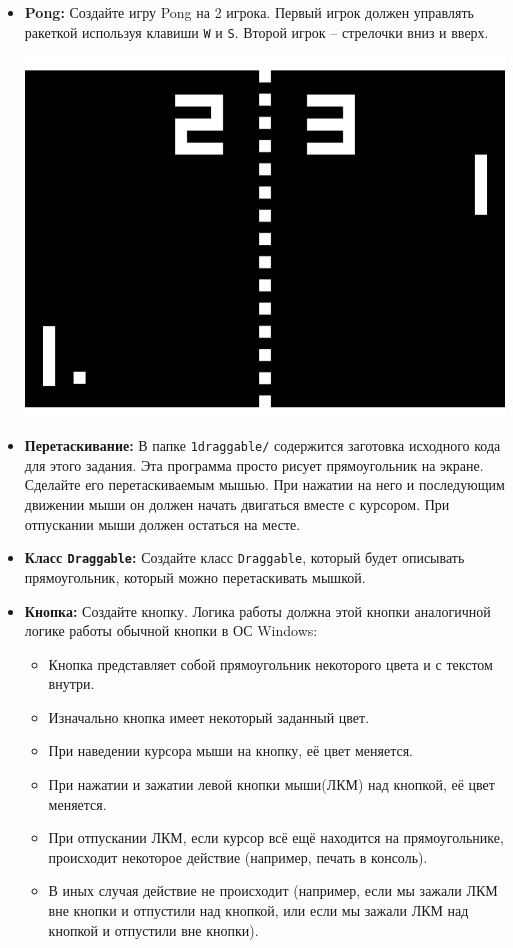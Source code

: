 \documentclass{article}
\begin{document}
\begin{itemize}
\item \textbf{Pong:} Создайте игру Pong на 2 игрока. Первый игрок должен управлять ракеткой используя клавиши \texttt{W} и \texttt{S}. Второй игрок -- стрелочки вниз и вверх.
\begin{center}
\includegraphics[scale=0.5]{../images/pong.png}
\end{center}

\item \textbf{Перетаскивание:} В папке \texttt{1draggable/} содержится заготовка исходного кода для этого задания. Эта программа просто рисует прямоугольник на экране. Сделайте его перетаскиваемым мышью. При нажатии на него и последующим движении мыши он должен начать двигаться вместе с курсором. При отпускании мыши должен остаться на месте.

\item \textbf{Класс \texttt{Draggable}:} Создайте класс \texttt{Draggable}, который будет описывать прямоугольник, который можно перетаскивать мышкой.




\item \textbf{Кнопка:} Создайте кнопку. Логика работы должна этой кнопки аналогичной логике работы обычной кнопки в ОС Windows:
\begin{itemize}
\item Кнопка представляет собой прямоугольник некоторого цвета и с текстом внутри.
\item Изначально кнопка имеет некоторый заданный цвет.
\item При наведении курсора мыши на кнопку, её цвет меняется.
\item При нажатии и зажатии левой кнопки мыши(ЛКМ) над кнопкой, её цвет меняется.
\item При отпускании ЛКМ, если курсор всё ещё находится на прямоугольнике, происходит некоторое действие (например, печать в консоль).
\item В иных случая действие не происходит (например, если мы зажали ЛКМ вне кнопки и отпустили над кнопкой, или если мы зажали ЛКМ над кнопкой и отпустили вне кнопки).
\end{itemize}


\end{itemize}
\end{document}
